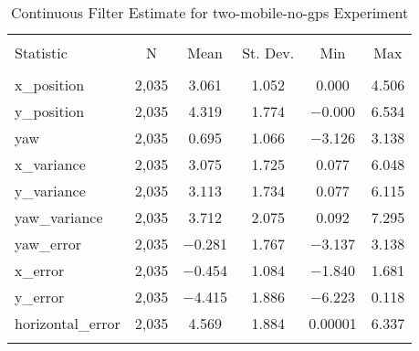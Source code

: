 
\begin{table}[h] \centering 
  \caption{Continuous Filter Estimate for two-mobile-no-gps Experiment} 
  \label{tab:two_mobile_no_gps_continuous_summary} 
\begin{tabular}{@{\extracolsep{5pt}}lccccc} 
\\[-1.8ex]\hline 
\hline \\[-1.8ex] 
Statistic & \multicolumn{1}{c}{N} & \multicolumn{1}{c}{Mean} & \multicolumn{1}{c}{St. Dev.} & \multicolumn{1}{c}{Min} & \multicolumn{1}{c}{Max} \\ 
\hline \\[-1.8ex] 
x\_position & 2,035 & 3.061 & 1.052 & 0.000 & 4.506 \\ 
y\_position & 2,035 & 4.319 & 1.774 & $-$0.000 & 6.534 \\ 
yaw & 2,035 & 0.695 & 1.066 & $-$3.126 & 3.138 \\ 
x\_variance & 2,035 & 3.075 & 1.725 & 0.077 & 6.048 \\ 
y\_variance & 2,035 & 3.113 & 1.734 & 0.077 & 6.115 \\ 
yaw\_variance & 2,035 & 3.712 & 2.075 & 0.092 & 7.295 \\ 
yaw\_error & 2,035 & $-$0.281 & 1.767 & $-$3.137 & 3.138 \\ 
x\_error & 2,035 & $-$0.454 & 1.084 & $-$1.840 & 1.681 \\ 
y\_error & 2,035 & $-$4.415 & 1.886 & $-$6.223 & 0.118 \\ 
horizontal\_error & 2,035 & 4.569 & 1.884 & 0.00001 & 6.337 \\ 
\hline \\[-1.8ex] 
\end{tabular} 
\end{table} 
